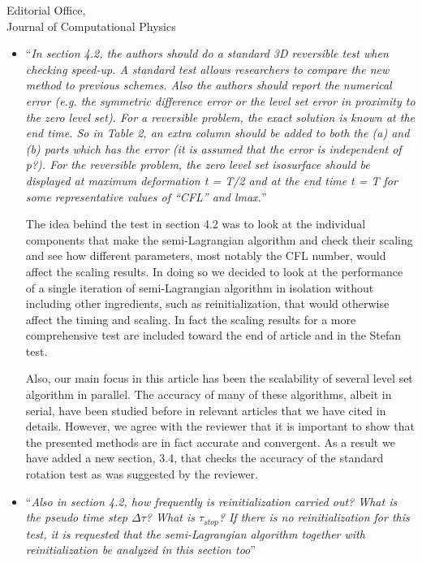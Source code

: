 \documentclass{scrlttr2}
\begin{document}
\begin{letter} {Editorial Office, \\ Journal of Computational
Physics}
\begin{itemize}
\begin{itemize}
Our method for interpolation only requires that the values of the function (and
optionally its second derivatives if using multi-quadratic interpolation) be
defined on all vertices of cell \texttt{c}. This, in turn is guaranteed by the
fact that the boundary of each process is covered by a layer of ghost cells that
have updated the ghost values at all their vertices before performing the
interpolation. As a result, all the vertices of cell \texttt{c}, whether local
or ghost, have valid values that can be used for interpolation.
\\
\item ``\textit{In section 4.2, the authors should do a standard 3D reversible
  test when checking speed-up. A standard test allows researchers to compare
the new method to previous schemes. Also the authors should report the
numerical error (e.g. the symmetric difference error or the level set error in
proximity to the zero level set). For a reversible problem, the exact solution
is known at the end time. So in Table 2, an extra column should be added to
both the (a) and (b) parts which has the error (it is assumed that the error is
independent of p?). For the reversible problem, the zero level set isosurface
should be displayed at maximum deformation t = T/2 and at the end time t = T
for some representative values of “CFL” and lmax.}''

The idea behind the test in section 4.2 was to look at the individual
components that make the semi-Lagrangian algorithm and check their scaling and
see how different parameters, most notably the CFL number, would affect the
scaling results. In doing so we decided to look at the performance of a single
iteration of semi-Lagrangian algorithm in isolation without including other
ingredients, such as reinitialization, that would otherwise affect the timing
and scaling. In fact the scaling results for a more comprehensive test are
included toward the end of article and in the Stefan test.

Also, our main focus in this article has been the scalability of several level
set algorithm in parallel. The accuracy of many of these algorithms, albeit in
serial, have been studied before in relevant articles that we have cited in
details. However, we agree with the reviewer that it is important to show that
the presented methods are in fact accurate and convergent. As a result we have
added a new section, 3.4, that checks the accuracy of the standard rotation
test as was suggested by the reviewer.  
\\
\item ``\textit{Also in section 4.2, how frequently is reinitialization carried
  out? What is the pseudo time step $\Delta \tau$? What is $\tau_{stop}$? If
there is no reinitialization for this test, it is requested that the
semi-Lagrangian algorithm together with reinitialization be analyzed in this
section too}''


\end{itemize}
\end{itemize}
\end{letter}
\end{document}
